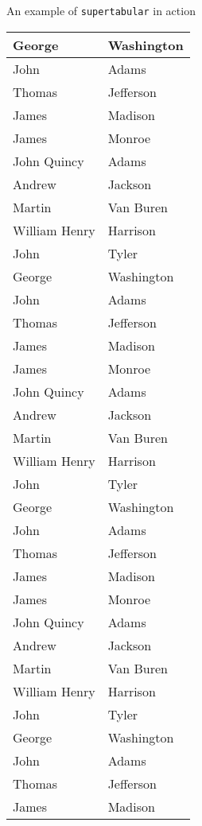 \documentclass{article}
\begin{document}
\begin{center}
An example of \texttt{supertabular} in action
\end{center}

\tabletail{\hline}
\begin{supertabular}{|l|l|}
George & Washington
\\ \hline John & Adams
\\ \hline Thomas & Jefferson
\\ \hline James & Madison
\\ \hline James & Monroe
\\ \hline John Quincy & Adams
\\ \hline Andrew & Jackson
\\ \hline Martin & Van Buren
\\ \hline William Henry & Harrison
\\ \hline John & Tyler
\\ \hline George & Washington
\\ \hline John & Adams
\\ \hline Thomas & Jefferson
\\ \hline James & Madison
\\ \hline James & Monroe
\\ \hline John Quincy & Adams
\\ \hline Andrew & Jackson
\\ \hline Martin & Van Buren
\\ \hline William Henry & Harrison
\\ \hline John & Tyler
\\ \hline George & Washington
\\ \hline John & Adams
\\ \hline Thomas & Jefferson
\\ \hline James & Madison
\\ \hline James & Monroe
\\ \hline John Quincy & Adams
\\ \hline Andrew & Jackson
\\ \hline Martin & Van Buren
\\ \hline William Henry & Harrison
\\ \hline John & Tyler
\\ \hline George & Washington
\\ \hline John & Adams
\\ \hline Thomas & Jefferson
\\ \hline James & Madison

\end{supertabular}
\end{document}
